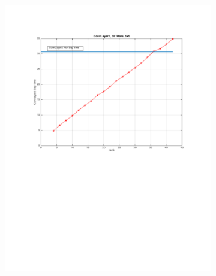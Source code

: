 \documentclass{article} %
\begin{document}
\begin{figure}[h]
  \centering
  \begin{subfigure}[b]{0.40\textwidth}
   \includegraphics[width=\textwidth]{images/imagesCNN_page3.pdf}
    \caption{}
  \end{subfigure}
  \begin{subfigure}[b]{0.40\textwidth}

\end{subfigure}
\end{figure}
\end{document}
